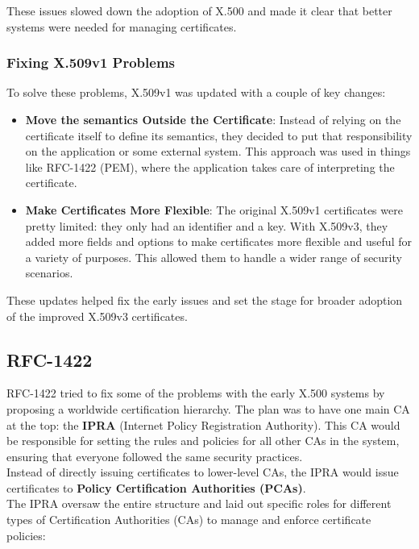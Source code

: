 These issues slowed down the adoption of X.500 and made it clear that
better systems were needed for managing certificates.

\subsubsection{Fixing X.509v1 Problems}

To solve these problems, X.509v1 was updated with a couple of key
changes:

\begin{itemize}
  \item \textbf{Move the semantics Outside the Certificate}: Instead of
    relying on the certificate itself to define its semantics, they
    decided to put that responsibility on the application or some
    external system. This approach was used in things like RFC-1422
    (PEM), where the application takes care of interpreting the
    certificate.

  \item \textbf{Make Certificates More Flexible}: The original X.509v1
    certificates were pretty limited: they only had an identifier and a
    key. With X.509v3, they added more fields and options to make
    certificates more flexible and useful for a variety of purposes.
    This allowed them to handle a wider range of security scenarios.
\end{itemize}

These updates helped fix the early issues and set the stage for
broader adoption of the improved X.509v3 certificates.

\subsection{RFC-1422}
RFC-1422 tried to fix some of the problems with the early X.500
systems by proposing a worldwide certification hierarchy. The plan was
to have one main CA at the top: the \textbf{IPRA} (Internet Policy
Registration Authority). This CA would be responsible for setting the
rules and policies for all other CAs in the system, ensuring that
everyone followed the same security practices.\\
Instead of directly issuing certificates to lower-level CAs, the IPRA
would issue certificates to \textbf{Policy Certification Authorities
(PCAs)}.\\
The IPRA oversaw the entire structure and laid out specific
roles for different types of Certification Authorities (CAs) to manage
and enforce certificate policies:

